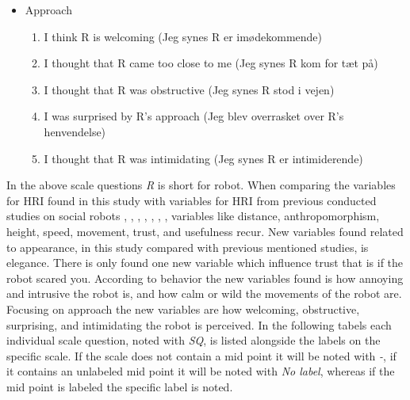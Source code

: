 \begin{itemize}
\begin{enumerate}
\end{enumerate}
\item Approach 
\begin{enumerate}
  \item I think R is welcoming (Jeg synes R er imødekommende)
  \item I thought that R came too close to me (Jeg synes R kom for tæt på)
  \item I thought that R was obstructive (Jeg synes R stod i vejen)
  \item I was surprised by R's approach (Jeg blev overrasket over R's henvendelse)
  \item I thought that R was intimidating (Jeg synes R er intimiderende)\\
\end{enumerate}
\end{itemize}
%
In the above scale questions \textit{R} is short for robot. When comparing the variables for HRI found in this study with variables for HRI from previous conducted studies on social robots \cite{PDF:ExploringInfluencingVariable}, \cite{PDF:SharingALifeHarvey}, \cite{PDF:InTheCompanyofRobots}, \cite{PDF:CloseButNotStuck}, \cite{PDF:TheImpactOfTraveler}, \cite{PDF:HumanRobotEmodiedInteraction}, \cite{PDF:RecommendationEffects}, variables like distance, anthropomorphism, height, speed, movement, trust, and usefulness recur. New variables found related to appearance, in this study compared with previous mentioned studies, is elegance. There is only found one new variable which influence trust that is if the robot scared you. According to behavior the new variables found is how annoying and intrusive the robot is, and how calm or wild the movements of the robot are. Focusing on approach the new variables are how welcoming, obstructive, surprising, and intimidating the robot is perceived. In the following tabels each individual scale question, noted with \textit{SQ}, is listed alongside the labels on the specific scale. If the scale does not contain a mid point it will be noted with \textit{-}, if it contains an unlabeled mid point it will be noted with \textit{No label}, whereas if the mid point is labeled the specific label is noted. 
%
